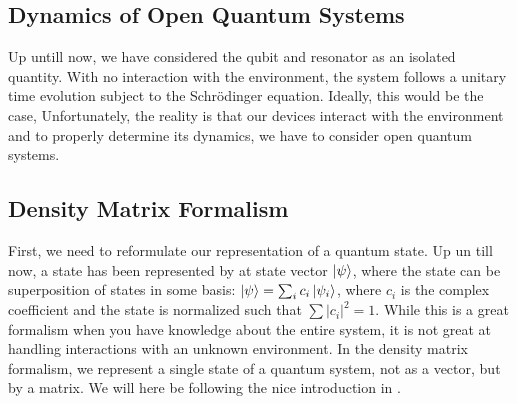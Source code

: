 \begin{fullwidth}
\chapter{Dynamics of Open Quantum Systems} \label{chap:open_quantum_systems}
\end{fullwidth}
Up untill now, we have considered the qubit and resonator as an isolated quantity. With no interaction with the environment, the system follows a unitary time evolution subject to the Schrödinger equation. Ideally, this would be the case, Unfortunately, the reality is that our devices interact with the environment and to properly determine its dynamics, we have to consider open quantum systems. \\


\section{Density Matrix Formalism}\label{sec:density_matrix_formalism}
First, we need to reformulate our representation of a quantum state. Up un till now, a state has been represented by at state vector $\ket{\psi}$, where the state can be superposition of states in some basis: $\ket{\psi} = \sum_i c_i\ket{\psi_i}$, where $c_i$ is the complex coefficient and the state is normalized such that $\sum |c_i|^2 = 1$. While this is a great formalism when you have knowledge about the entire system, it is not great at handling interactions with an unknown environment. In the density matrix formalism, we represent a single state of a quantum system, not as a vector, but by a matrix. We will here be following the nice introduction in \cite{manzano_short_2020}.

